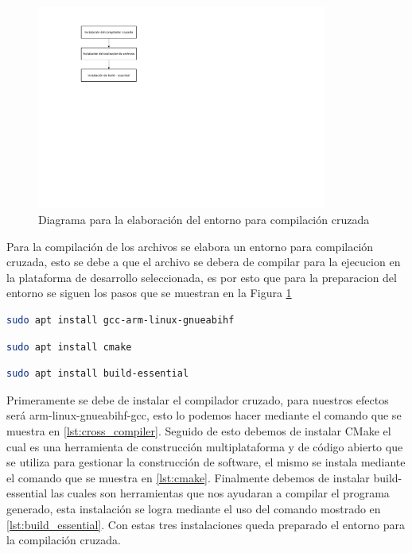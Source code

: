 \begin{figure}[h!]
    \centering
    \includegraphics[width=0.85\textwidth]{fig/especifico_2/diagrama_compilador_cruzado.pdf}
    \caption{Diagrama para la elaboración del entorno para compilación cruzada}
    \label{fig:cross_compile_diagram}
\end{figure}

Para la compilación de los archivos se elabora un entorno para compilación cruzada, esto se debe a que el archivo se debera de compilar para la ejecucion en la plataforma de desarrollo seleccionada, es por esto que para la preparacion del entorno se siguen los pasos que se muestran en la Figura \ref{fig:cross_compile_diagram}


\begin{lstlisting}[language=bash, caption={Instalacion del compilador cruzado, Contenedor}, label=lst:cross_compiler]
    sudo apt install gcc-arm-linux-gnueabihf
\end{lstlisting}

\begin{lstlisting}[language=bash, caption={Instalacion de CMake, Contenedor}, label=lst:cmake]
    sudo apt install cmake
\end{lstlisting}

\begin{lstlisting}[language=bash, caption={Instalacion de build essential, Contenedor }, label=lst:build_essential]
    sudo apt install build-essential
\end{lstlisting}

Primeramente se debe de instalar el compilador cruzado, para nuestros efectos será arm-linux-gnueabihf-gcc, esto lo podemos hacer mediante el comando que se muestra en \ref{lst:cross_compiler}. Seguido de esto debemos de instalar CMake el cual es una herramienta de construcción multiplataforma y de código abierto que se utiliza para gestionar la construcción de software, el mismo se instala mediante el comando que se muestra en \ref{lst:cmake}. Finalmente debemos  de instalar build-essential las cuales son herramientas que nos ayudaran a compilar el programa generado, esta instalación se logra mediante el uso del comando mostrado en \ref{lst:build_essential}. Con estas tres instalaciones queda preparado el entorno para la compilación cruzada. 


